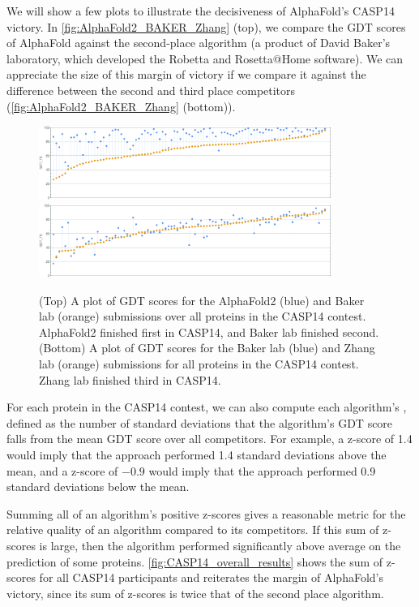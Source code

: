 We will show a few plots to illustrate the decisiveness of AlphaFold's CASP14 victory. In \autoref{fig:AlphaFold2_BAKER_Zhang} (top), we compare the GDT scores of AlphaFold against the second-place algorithm (a product of David Baker's laboratory, which developed the Robetta and Rosetta@Home software). We can appreciate the size of this margin of victory if we compare it against the difference between the second and third place competitors (\autoref{fig:AlphaFold2_BAKER_Zhang} (bottom)).\\

\begin{figure}[h]
	\centering
	\mySfFamily
	\includegraphics[width = 0.85\textwidth]{../images_CMYK/AlphaFold2_BAKER}\\[4ex]
	\includegraphics[width = 0.85\textwidth]{../images_CMYK/BAKER_Zhang}
	\caption{(Top) A plot of GDT scores for the AlphaFold2 (blue) and Baker lab (orange) submissions over all proteins in the CASP14 contest. AlphaFold2 finished first in CASP14, and Baker lab finished second. (Bottom) A plot of GDT scores for the Baker lab (blue) and Zhang lab (orange) submissions for all proteins in the CASP14 contest. Zhang lab finished third in CASP14.}
	\label{fig:AlphaFold2_BAKER_Zhang}
\end{figure}

For each protein in the CASP14 contest, we can also compute each algorithm's , defined as the number of standard deviations that the algorithm's GDT score falls from the mean GDT score over all competitors. For example, a z-score of 1.4 would imply that the approach performed 1.4 standard deviations above the mean, and a z-score of $-0.9$ would imply that the approach performed 0.9 standard deviations below the mean.

Summing all of an algorithm's positive z-scores gives a reasonable metric for the relative quality of an algorithm compared to its competitors. If this sum of z-scores is large, then the algorithm performed significantly above average on the prediction of some proteins. \autoref{fig:CASP14_overall_results} shows the sum of z-scores for all CASP14 participants and reiterates the margin of AlphaFold's victory, since its sum of z-scores is twice that of the second place algorithm.

